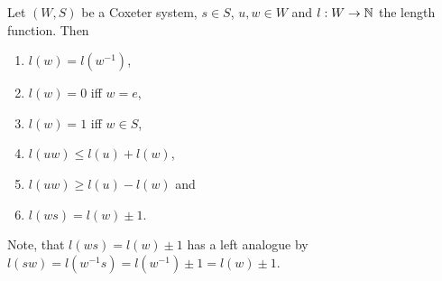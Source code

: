 \begin{lemm}
	Let $(W,S)$ be a Coxeter system, $s \in S$, $u, w \in W$ and $l : W \to \mathbb{N}$ the length function. Then
	\begin{enumerate}
		\item $l(w) = l(w^{-1})$,
		\item $l(w) = 0$ iff $w = e$,
		\item $l(w) = 1$ iff $w \in S$,
		\item $l(uw) \leq l(u) + l(w)$,
		\item $l(uw) \geq l(u) - l(w)$ and
		\item $l(ws) = l(w) \pm 1$.
	\end{enumerate}
\end{lemm}

\begin{rema}
	Note, that $l(ws) = l(w) \pm 1$ has a left analogue by $l(sw) = l(w^{-1} s) = l(w^{-1}) \pm 1 = l(w) \pm 1$.
\end{rema}